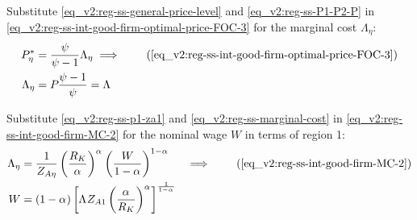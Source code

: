 \documentclass[../thesis.tex]{subfiles}
\begin{document}
Substitute \ref{eq_v2:reg-ss-general-price-level} and \ref{eq_v2:reg-ss-P1-P2-P} in \ref{eq_v2:reg-ss-int-good-firm-optimal-price-FOC-3} for the marginal cost $\Lambda_{\eta}$:
\begin{align}
	P_{\eta}^{\ast} &= \frac{\psi}{\psi-1} \Lambda_{\eta} \implies \tag{\ref{eq_v2:reg-ss-int-good-firm-optimal-price-FOC-3}} \\
	\Lambda_{\eta} &= P_{} \frac{\psi-1}{\psi} = \Lambda_{} \label{eq_v2:reg-ss-marginal-cost}
\end{align}

Substitute \ref{eq_v2:reg-ss-p1-za1} and \ref{eq_v2:reg-ss-marginal-cost} in \ref{eq_v2:reg-ss-int-good-firm-MC-2} for the nominal wage $W$ in terms of region 1:
\begin{alignat}{2}
	\Lambda_{\eta} &= \frac{1}{Z_{A\eta}} \left( \frac{R_K}{{\alpha_{}}} \right)^{{\alpha_{}}} \left( \frac{W}{1-{\alpha_{}}} \right)^{1-{\alpha_{}}} &\implies \tag{\ref{eq_v2:reg-ss-int-good-firm-MC-2}} \\ 
	W &= (1-{\alpha_{}}) \left[ \Lambda_{} Z_{A1} \left( \frac{{\alpha_{}}}{R_K} \right)^{{\alpha_{}}} \right]^\frac{1}{1-{\alpha_{}}} & \label{eq_v2:reg-ss-nominal-wage}
\end{alignat}

\begin{comment}
	Substitute \ref{eq_v2:reg-ss-nominal-wage} in \ref{eq_v2:reg-ss-int-good-firm-MC-2} for the technology level of region 2, $Z_{A2}$:
	\begin{align}
		\Lambda_{\eta} &= \frac{1}{Z_{A\eta}} \left( \frac{R_K}{{\alpha_{}}} \right)^{{\alpha_{}}} \left( \frac{W}{1-{\alpha_{}}} \right)^{1-{\alpha_{}}} \implies \tag{\ref{eq_v2:reg-ss-int-good-firm-MC-2}} \\
		Z_{A2} &= \frac{1}{\Lambda_{}} \left( \frac{R_K}{{\alpha_{}}} \right)^{{\alpha_{}}} \left( \frac{W}{1-{\alpha_{}}} \right)^{1-{\alpha_{}}} \label{eq_v2:reg-ss-za2}
	\end{align}
\end{comment}
\end{document}
